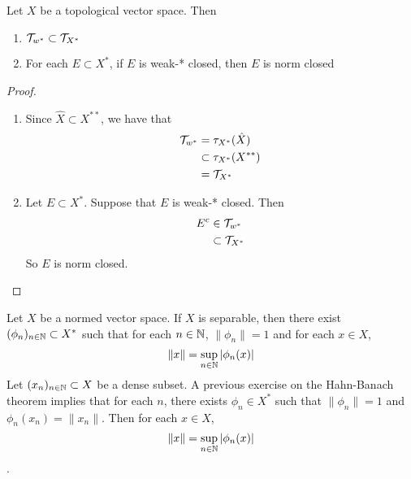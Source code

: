 \documentclass{book}
\begin{document}
	\begin{ex}
		Let $X$ be a topological vector space. Then 
		\begin{enumerate}
			\item $\mathcal{T}_{w^*} \subset \mathcal{T}_{X^*}$
			\item For each $E \subset X^*$, if $E$ is weak-* closed, then $E$ is norm closed 
		\end{enumerate}
	\end{ex} 
	
	\begin{proof}\
		\begin{enumerate}
			\item Since $\hat{X} \subset X^{**}$, we have that 
			\begin{align*}
				\mathcal{T}_{w^*}
				& = \tau_{X^*}(\hat{X}) \\
				& \subset \tau_{X^*}(X^{**}) \\
				& = \mathcal{T}_{X^*}
			\end{align*}
			\item Let $E \subset X^*$. Suppose that $E$ is weak-* closed. Then 
			\begin{align*}
				E^c 
				& \in \mathcal{T}_{w^*} \\
				& \subset \mathcal{T}_{X^*} \\
			\end{align*}
			So $E$ is norm closed. 
		\end{enumerate}
	\end{proof}

	\begin{ex}
		Let $X$ be a normed vector space. If $X$ is separable, then there exist $(\phi_n)_{n \in \mathbb{N}} \subset X^*$ such that for each $n \in \mathbb{N}$, $\|\phi_n\| = 1$ and for each $x \in X$, 
		$$\|x\| = \sup_{n \in \mathbb{N}} |\phi_n(x)|$$  
		 Let $(x_n)_{n \in \mathbb{N}} \subset X$ be a dense subset. A previous exercise on the Hahn-Banach theorem implies that for each $n$, there exists $\phi_n \in X^*$ such that $\|\phi_n\| = 1$ and $\phi_n(x_n) = \|x_n\|$. Then for each $x \in X$, $$\|x\| = \sup_{n \in \mathbb{N}} |\phi_n(x)|$$. 
	\end{ex}
	
\end{document}
